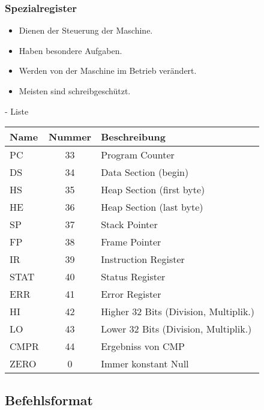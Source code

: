 \subsubsection{Spezialregister}

\begin{frame}{\insertsubsubsection}
 \begin{itemize}
   \item Dienen der Steuerung der Maschine.
   \item Haben besondere Aufgaben.
   \item Werden von der Maschine im Betrieb verändert.
   \item Meisten sind schreibgeschützt.
 \end{itemize}
\end{frame}



\begin{frame}{\insertsubsubsection{} - Liste}
 \begin{tabular}{lcl}
Name  & Nummer & Beschreibung                \\\toprule
PC    & 33     & Program Counter             \\ 
DS    & 34     & Data Section (begin)        \\ 
HS    & 35     & Heap Section (first byte)   \\ 
HE    & 36     & Heap Section (last byte)    \\ 
SP    & 37     & Stack Pointer               \\
FP    & 38     & Frame Pointer               \\
IR    & 39     & Instruction Register        \\
STAT  & 40     & Status Register             \\
ERR   & 41     & Error Register              \\
HI    & 42     & Higher 32 Bits (Division, Multiplik.) \\
LO    & 43     & Lower 32 Bits (Division, Multiplik.)  \\
CMPR  & 44     & Ergebniss von CMP           \\
ZERO  & 0      & Immer konstant Null         \\\bottomrule
 \end{tabular}
\end{frame}



\subsection{Befehlsformat}

